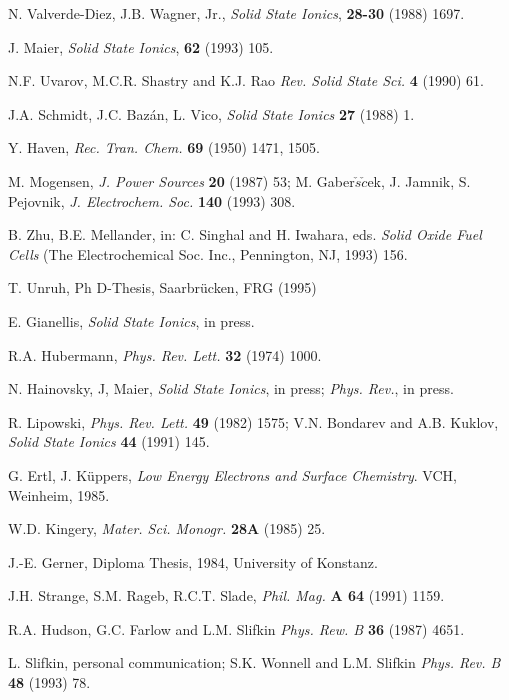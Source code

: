 \documentclass{elsart}
\begin{document}
\begin{thebibliography}{999}
 N. Valverde-Diez, J.B. Wagner, Jr., {\em Solid State
  Ionics\/}, {\bf 28-30} (1988) 1697.

 J. Maier, {\em Solid State Ionics\/}, {\bf 62} (1993) 105.

 N.F. Uvarov, M.C.R. Shastry and K.J. Rao {\em Rev. Solid
State Sci.\/} {\bf 4} (1990) 61.

 J.A. Schmidt, J.C. Baz\'an, L. Vico, {\em Solid State
  Ionics\/} {\bf 27} (1988) 1.

 Y. Haven, {\em Rec. Tran. Chem.\/} {\bf 69} (1950) 1471, 1505.

 M. Mogensen, {\em J. Power Sources\/} {\bf 20} (1987) 53;
  M. Gaber$\check{s}\check{c}$ek, J. Jamnik, S. Pejovnik, {\em
    J. Electrochem. Soc.\/} {\bf 140} (1993) 308.

 B. Zhu, B.E. Mellander, in: C. Singhal and H. Iwahara, eds. {\em
    Solid Oxide Fuel Cells\/} (The Electrochemical Soc. Inc., Pennington, NJ,
  1993) 156. 

 T. Unruh, Ph D-Thesis, Saarbr\"ucken, FRG (1995)

 E. Gianellis, {\em Solid State Ionics\/}, in press. 

 R.A. Hubermann, {\em Phys. Rev. Lett.\/} {\bf 32} (1974) 1000.

 N. Hainovsky, J, Maier, {\em Solid State Ionics\/}, in press;
  {\em Phys. Rev.}, in press. 

 R. Lipowski, {\em Phys. Rev. Lett.\/} {\bf 49} (1982) 1575; V.N.
Bondarev and A.B. Kuklov, {\em Solid State Ionics\/} {\bf 44} (1991) 145. 

 G. Ertl, J. K\"uppers, {\em Low Energy Electrons and Surface
Chemistry\/}. VCH, Weinheim, 1985. 

 W.D. Kingery, {\em Mater. Sci. Monogr.\/} {\bf 28A} (1985) 25.

 J.-E. Gerner, Diploma Thesis, 1984, University of Konstanz.

 J.H. Strange, S.M. Rageb, R.C.T. Slade, {\em Phil. Mag.\/}
{\bf A 64} (1991) 1159.

 R.A. Hudson, G.C. Farlow and L.M. Slifkin {\em Phys. Rew. B\/}
{\bf 36} (1987) 4651. 

 L. Slifkin, personal communication; S.K. Wonnell and L.M.
Slifkin {\em Phys. Rev. B\/} {\bf 48} (1993) 78.


\end{thebibliography}
\end{document}
